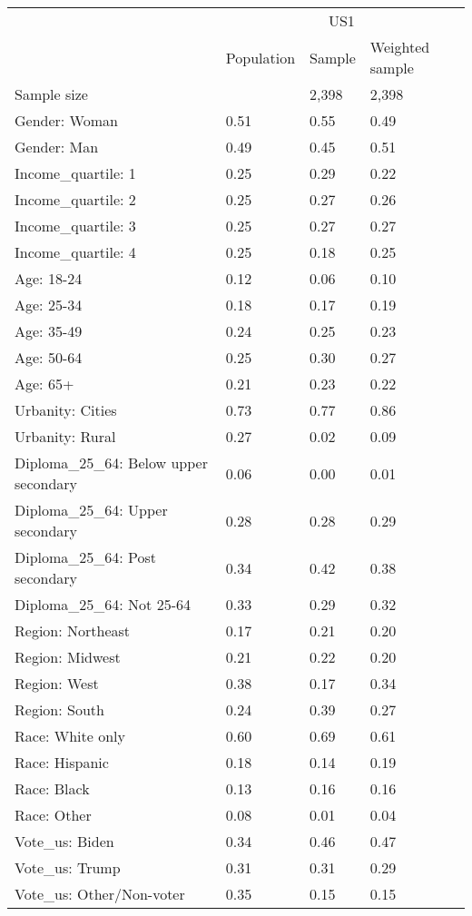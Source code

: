 
\begin{tabular}[t]{llll}
\toprule
\multicolumn{1}{c}{} & \multicolumn{3}{c}{US1} \\
\cmidrule(l{3pt}r{3pt}){2-4}
  & Population & Sample & Weighted sample\\
\midrule
Sample size &  & 2,398 & 2,398\\
\addlinespace
Gender: Woman & 0.51 & 0.55 & 0.49\\
Gender: Man & 0.49 & 0.45 & 0.51\\
\addlinespace
Income\_quartile: 1 & 0.25 & 0.29 & 0.22\\
Income\_quartile: 2 & 0.25 & 0.27 & 0.26\\
Income\_quartile: 3 & 0.25 & 0.27 & 0.27\\
Income\_quartile: 4 & 0.25 & 0.18 & 0.25\\
\addlinespace
Age: 18-24 & 0.12 & 0.06 & 0.10\\
Age: 25-34 & 0.18 & 0.17 & 0.19\\
Age: 35-49 & 0.24 & 0.25 & 0.23\\
Age: 50-64 & 0.25 & 0.30 & 0.27\\
Age: 65+ & 0.21 & 0.23 & 0.22\\
\addlinespace
Urbanity: Cities & 0.73 & 0.77 & 0.86\\
Urbanity: Rural & 0.27 & 0.02 & 0.09\\
\addlinespace
Diploma\_25\_64: Below upper secondary & 0.06 & 0.00 & 0.01\\
Diploma\_25\_64: Upper secondary & 0.28 & 0.28 & 0.29\\
Diploma\_25\_64: Post secondary & 0.34 & 0.42 & 0.38\\
Diploma\_25\_64: Not 25-64 & 0.33 & 0.29 & 0.32\\
\addlinespace
Region: Northeast & 0.17 & 0.21 & 0.20\\
Region: Midwest & 0.21 & 0.22 & 0.20\\
Region: West & 0.38 & 0.17 & 0.34\\
Region: South & 0.24 & 0.39 & 0.27\\
\addlinespace
Race: White only & 0.60 & 0.69 & 0.61\\
Race: Hispanic & 0.18 & 0.14 & 0.19\\
Race: Black & 0.13 & 0.16 & 0.16\\
Race: Other & 0.08 & 0.01 & 0.04\\
\addlinespace
Vote\_us: Biden & 0.34 & 0.46 & 0.47\\
Vote\_us: Trump & 0.31 & 0.31 & 0.29\\
Vote\_us: Other/Non-voter & 0.35 & 0.15 & 0.15\\
\bottomrule
\end{tabular}